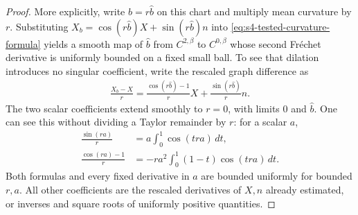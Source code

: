 \documentclass[a4paper,11pt,oneside,reqno]{amsart}
\numberwithin{equation}{section}
\theoremstyle{definition}
\begin{document}
\begin{proof}
    More explicitly, write $b=r\widehat b$ on this chart and
    multiply mean curvature by $r$. Substituting
    $X_b=\cos(r\widehat b)X+\sin(r\widehat b)n$ into
    \eqref{eq:s4-tested-curvature-formula} yields a smooth map
    of $\widehat b$ from $C^{2,\beta}$ to $C^{0,\beta}$ whose
    second Fr\'echet derivative is uniformly bounded on a fixed
    small ball. To see that dilation introduces no singular
    coefficient, write the rescaled graph difference as
    \begin{align*}
        \frac{X_b-X}{r}
        =\frac{\cos(r\widehat b)-1}{r}X
        +\frac{\sin(r\widehat b)}{r}n.
    \end{align*}
    The two scalar coefficients extend smoothly to $r=0$,
    with limits $0$ and $\widehat b$. One can see this without
    dividing a Taylor remainder by $r$: for a scalar $a$,
    \begin{align*}
        \frac{\sin(ra)}r
        &=a\int_0^1\cos(tra)\,dt,\\
        \frac{\cos(ra)-1}r
        &=-ra^2\int_0^1(1-t)\cos(tra)\,dt.
    \end{align*}
    Both formulas and every fixed derivative in $a$ are
    bounded uniformly for bounded $r,a$. All other
    coefficients are the rescaled derivatives of $X,n$
    already estimated, or inverses and square roots of
    uniformly positive quantities.


\end{proof}
\end{document}
